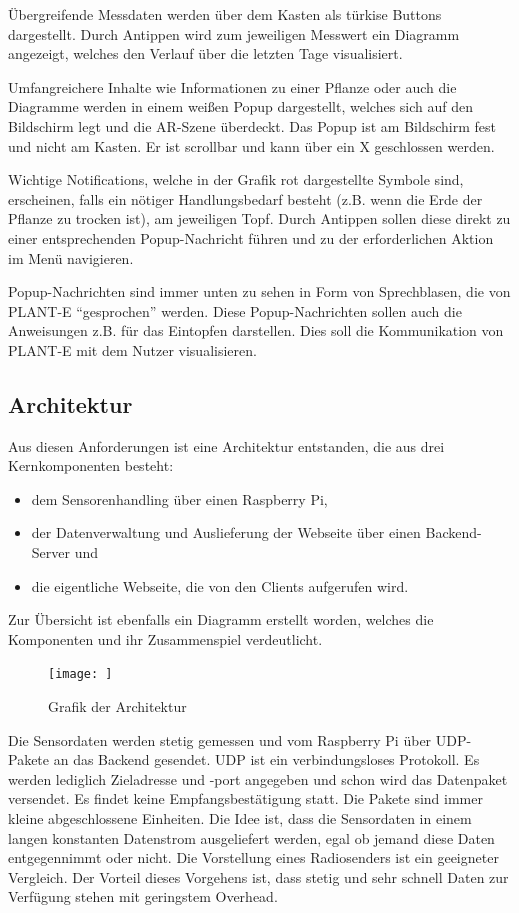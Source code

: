 Übergreifende Messdaten werden über dem Kasten als türkise Buttons
dargestellt. Durch Antippen wird zum jeweiligen Messwert ein Diagramm
angezeigt, welches den Verlauf über die letzten Tage visualisiert.

Umfangreichere Inhalte wie Informationen zu einer Pflanze oder auch die
Diagramme werden in einem weißen Popup dargestellt, welches sich auf den
Bildschirm legt und die AR-Szene überdeckt. Das Popup ist am Bildschirm
fest und nicht am Kasten. Er ist scrollbar und kann über ein X
geschlossen werden.

Wichtige Notifications, welche in der Grafik rot dargestellte Symbole
sind, erscheinen, falls ein nötiger Handlungsbedarf besteht (z.B. wenn
die Erde der Pflanze zu trocken ist), am jeweiligen Topf. Durch Antippen
sollen diese direkt zu einer entsprechenden Popup-Nachricht führen und
zu der erforderlichen Aktion im Menü navigieren.

Popup-Nachrichten sind immer unten zu sehen in Form von Sprechblasen,
die von PLANT-E ``gesprochen'' werden. Diese Popup-Nachrichten sollen
auch die Anweisungen z.B. für das Eintopfen darstellen. Dies soll die
Kommunikation von PLANT-E mit dem Nutzer visualisieren.

\hypertarget{architektur}{%
\subsection{Architektur}\label{architektur}}

Aus diesen Anforderungen ist eine Architektur entstanden, die aus drei
Kernkomponenten besteht:

\begin{itemize}
\tightlist
\item
  dem Sensorenhandling über einen Raspberry Pi,
\item
  der Datenverwaltung und Auslieferung der Webseite über einen
  Backend-Server und
\item
  die eigentliche Webseite, die von den Clients aufgerufen wird.
\end{itemize}

Zur Übersicht ist ebenfalls ein Diagramm erstellt worden, welches die
Komponenten und ihr Zusammenspiel verdeutlicht.

\begin{figure}
\centering
\texttt{[image: ]}
\caption{Grafik der Architektur}
\end{figure}

Die Sensordaten werden stetig gemessen und vom Raspberry Pi über
UDP-Pakete an das Backend gesendet. UDP ist ein verbindungsloses
Protokoll. Es werden lediglich Zieladresse und -port angegeben und schon
wird das Datenpaket versendet. Es findet keine Empfangsbestätigung
statt. Die Pakete sind immer kleine abgeschlossene Einheiten. Die Idee
ist, dass die Sensordaten in einem langen konstanten Datenstrom
ausgeliefert werden, egal ob jemand diese Daten entgegennimmt oder
nicht. Die Vorstellung eines Radiosenders ist ein geeigneter Vergleich.
Der Vorteil dieses Vorgehens ist, dass stetig und sehr schnell Daten zur
Verfügung stehen mit geringstem Overhead.

